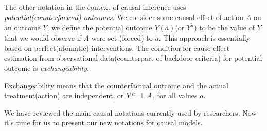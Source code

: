 The other notation in the context of causal inference uses \emph{potential(counterfactual) outcomes}. We consider some causal effect of action $A$ on an outcome $Y$, we define the potential outcome $Y(\tilde{a})$(or $Y^{\tilde{a}}$) to be the value of $Y$ that we would observe if $A$ were set (forced) to $\tilde{a}$.  This approach is essentially based on perfect(atomatic) interventions. The condition for cause-effect estimation from observational data(counterpart of backdoor criteria)  for potential outcome is \emph{exchangeability}. 

\begin{Def}
	Exchangeability means that the counterfactual outcome and the actual treatment(action) are independent, or $Y^a \perp\mkern-9.5mu\perp A$, for all values $a$. 
\end{Def}


 

We have reviewed the main causal notations currently used by researchers. Now it's time for us to present our new notations for causal models.

